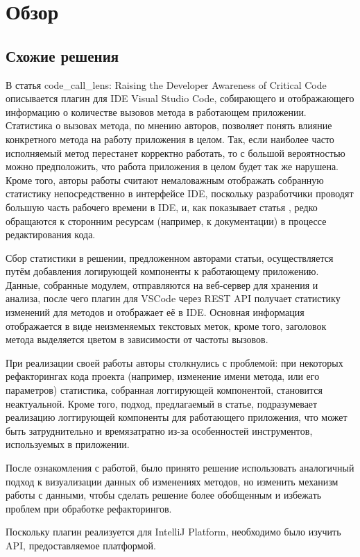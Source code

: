 \documentclass[14pt]{matmex-diploma-custom}
\begin{document}
\section{Обзор}
\subsection{Схожие решения}
В статья code\_call\_lens: Raising the Developer Awareness of Critical Code \cite{janes2018code_call_lens} описывается плагин для IDE Visual Studio Code, собирающего и отображающего информацию о количестве вызовов метода в работающем приложении. Статистика о вызовах метода, по мнению авторов, позволяет понять влияние конкретного метода на работу приложения в целом. Так, если наиболее часто исполняемый метод перестанет корректно работать, то с большой вероятностью можно предположить, что работа приложения в целом будет так же нарушена. Кроме того, авторы работы считают немаловажным отображать собранную статистику непосредственно в интерфейсе IDE, поскольку разработчики проводят большую часть рабочего времени в IDE, и, как показывает статья \cite{johnson2001you}, редко обращаются к сторонним ресурсам (например, к документации) в процессе редактирования кода.


Сбор статистики в решении, предложенном авторами статьи, осуществляется путём добавления логирующей компоненты к работающему приложению. Данные, собранные модулем, отправляются на веб-сервер для хранения и анализа, после чего плагин для VSCode через REST API получает статистику изменений для методов и отображает её в IDE. Основная информация отображается в виде неизменяемых текстовых меток, кроме того, заголовок метода выделяется цветом в зависимости от частоты вызовов.


При реализации своей работы авторы столкнулись с проблемой: при некоторых рефакторингах кода проекта (например, изменение имени метода, или его параметров) статистика, собранная логгирующей компонентой, становится неактуальной. Кроме того, подход, предлагаемый в статье, подразумевает реализацию логгирующей компоненты для работающего приложения, что может быть затруднительно и времязатратно из-за особенностей инструментов, используемых в приложении. 


После ознакомления с работой, было принято решение использовать аналогичный подход к визуализации данных об изменениях методов, но изменить механизм работы с данными, чтобы сделать решение более обобщенным и избежать проблем при обработке рефакторингов. 

Поскольку плагин реализуется для IntelliJ Platform, необходимо было изучить API, предоставляемое платформой.
\end{document}
